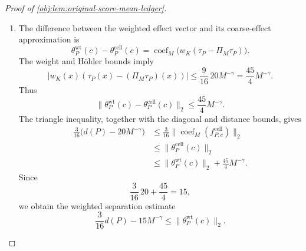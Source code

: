 \documentclass[11pt]{article}
\begin{document}
\begin{proof}[Proof of \cref{obj:lem:original-score-mean-ledger}]
\begin{enumerate}
The Hölder estimate applied using
\cref{obj:ass:effect-smoothness} gives
\[
\left|f^{\mathrm{raw}}_{P,c}(x)-(\Pi_Mf^{\mathrm{raw}}_{P,c})(x)\right|
=
|\tau_P(x)-(\Pi_M\tau_P)(x)|
\le20M^{-\gamma}.
\]
Since \(\lambda\) is a probability measure,
\[
\int_0^1
\bigl(f^{\mathrm{raw}}_{P,c}-\Pi_Mf^{\mathrm{raw}}_{P,c}\bigr)^2
\,d\lambda
\le(20M^{-\gamma})^2.
\]
On the other hand, expansion around the mean gives
\[
\begin{aligned}
\int_0^1(\tau_P(x)-c)^2\,d\lambda(x)
&=\int_0^1\tau_P(x)^2\,d\lambda(x)-2c\bar\tau_P+c^2\\
&=d(P)^2+(\bar\tau_P-c)^2
\ge d(P)^2.
\end{aligned}
\]
Combining these displays yields
\[
d(P)^2
\le
\|\operatorname{coef}_M(f^{\mathrm{cell}}_{P,c})\|_2^2
+(20M^{-\gamma})^2
\le
\left(
\|\operatorname{coef}_M(f^{\mathrm{cell}}_{P,c})\|_2
+20M^{-\gamma}
\right)^2.
\]
Both sides inside the last square are nonnegative, so
\[
d(P)-20M^{-\gamma}
\le
\|\operatorname{coef}_M(f^{\mathrm{cell}}_{P,c})\|_2.
\]

\item
The difference between the weighted effect vector and its coarse-effect approximation is
\[
\theta^{\mathrm{wt}}_P(c)-\theta^{\mathrm{cell}}_P(c)
=
\operatorname{coef}_M\bigl(w_K(\tau_P-\Pi_M\tau_P)\bigr).
\]
The weight and Hölder bounds imply
\[
|w_K(x)(\tau_P(x)-(\Pi_M\tau_P)(x))|
\le
\frac9{16}\,20M^{-\gamma}
=
\frac{45}{4}M^{-\gamma}.
\]
Thus
\[
\|\theta^{\mathrm{wt}}_P(c)-\theta^{\mathrm{cell}}_P(c)\|_2
\le\frac{45}{4}M^{-\gamma}.
\]
The triangle inequality, together with the diagonal and distance bounds, gives
\[
\begin{aligned}
\frac3{16}\bigl(d(P)-20M^{-\gamma}\bigr)
&\le
\frac3{16}\|\operatorname{coef}_M(f^{\mathrm{cell}}_{P,c})\|_2\\
&\le\|\theta^{\mathrm{cell}}_P(c)\|_2\\
&\le
\|\theta^{\mathrm{wt}}_P(c)\|_2
+\frac{45}{4}M^{-\gamma}.
\end{aligned}
\]
Since
\[
\frac3{16}\,20+\frac{45}{4}=15,
\]
we obtain the weighted separation estimate
\[
\frac3{16}d(P)-15M^{-\gamma}
\le\|\theta^{\mathrm{wt}}_P(c)\|_2.
\]


\end{enumerate}
\end{proof}
\end{document}
